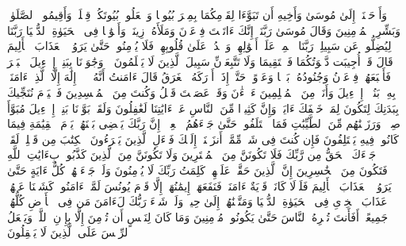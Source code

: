 \startbuffer[\q:10:87]
وَأَوۡحَیۡنَاۤ إِلَىٰ مُوسَىٰ وَأَخِیهِ أَن تَبَوَّءَا لِقَوۡمِكُمَا بِمِصۡرَ بُیُوتࣰا وَٱجۡعَلُوا۟ بُیُوتَكُمۡ قِبۡلَةࣰ وَأَقِیمُوا۟ ٱلصَّلَوٰةَۗ وَبَشِّرِ ٱلۡمُؤۡمِنِینَ%
\stopbuffer
\startbuffer[\q:10:88]
وَقَالَ مُوسَىٰ رَبَّنَاۤ إِنَّكَ ءَاتَیۡتَ فِرۡعَوۡنَ وَمَلَأَهُۥ زِینَةࣰ وَأَمۡوَٰلࣰا فِی ٱلۡحَیَوٰةِ ٱلدُّنۡیَا رَبَّنَا لِیُضِلُّوا۟ عَن سَبِیلِكَۖ رَبَّنَا ٱطۡمِسۡ عَلَىٰۤ أَمۡوَٰلِهِمۡ وَٱشۡدُدۡ عَلَىٰ قُلُوبِهِمۡ فَلَا یُؤۡمِنُوا۟ حَتَّىٰ یَرَوُا۟ ٱلۡعَذَابَ ٱلۡأَلِیمَ%
\stopbuffer
\startbuffer[\q:10:89]
قَالَ قَدۡ أُجِیبَت دَّعۡوَتُكُمَا فَٱسۡتَقِیمَا وَلَا تَتَّبِعَاۤنِّ سَبِیلَ ٱلَّذِینَ لَا یَعۡلَمُونَ%
\stopbuffer
\startbuffer[\q:10:90]
۞ وَجَٰوَزۡنَا بِبَنِیۤ إِسۡرَٰۤءِیلَ ٱلۡبَحۡرَ فَأَتۡبَعَهُمۡ فِرۡعَوۡنُ وَجُنُودُهُۥ بَغۡیࣰا وَعَدۡوًاۖ حَتَّىٰۤ إِذَاۤ أَدۡرَكَهُ ٱلۡغَرَقُ قَالَ ءَامَنتُ أَنَّهُۥ لَاۤ إِلَٰهَ إِلَّا ٱلَّذِیۤ ءَامَنَتۡ بِهِۦ بَنُوۤا۟ إِسۡرَٰۤءِیلَ وَأَنَا۠ مِنَ ٱلۡمُسۡلِمِینَ%
\stopbuffer
\startbuffer[\q:10:91]
ءَاۤلۡءَٰنَ وَقَدۡ عَصَیۡتَ قَبۡلُ وَكُنتَ مِنَ ٱلۡمُفۡسِدِینَ%
\stopbuffer
\startbuffer[\q:10:92]
فَٱلۡیَوۡمَ نُنَجِّیكَ بِبَدَنِكَ لِتَكُونَ لِمَنۡ خَلۡفَكَ ءَایَةࣰۚ وَإِنَّ كَثِیرࣰا مِّنَ ٱلنَّاسِ عَنۡ ءَایَٰتِنَا لَغَٰفِلُونَ%
\stopbuffer
\startbuffer[\q:10:93]
وَلَقَدۡ بَوَّأۡنَا بَنِیۤ إِسۡرَٰۤءِیلَ مُبَوَّأَ صِدۡقࣲ وَرَزَقۡنَٰهُم مِّنَ ٱلطَّیِّبَٰتِ فَمَا ٱخۡتَلَفُوا۟ حَتَّىٰ جَاۤءَهُمُ ٱلۡعِلۡمُۚ إِنَّ رَبَّكَ یَقۡضِی بَیۡنَهُمۡ یَوۡمَ ٱلۡقِیَٰمَةِ فِیمَا كَانُوا۟ فِیهِ یَخۡتَلِفُونَ%
\stopbuffer
\startbuffer[\q:10:94]
فَإِن كُنتَ فِی شَكࣲّ مِّمَّاۤ أَنزَلۡنَاۤ إِلَیۡكَ فَسۡءَلِ ٱلَّذِینَ یَقۡرَءُونَ ٱلۡكِتَٰبَ مِن قَبۡلِكَۚ لَقَدۡ جَاۤءَكَ ٱلۡحَقُّ مِن رَّبِّكَ فَلَا تَكُونَنَّ مِنَ ٱلۡمُمۡتَرِینَ%
\stopbuffer
\startbuffer[\q:10:95]
وَلَا تَكُونَنَّ مِنَ ٱلَّذِینَ كَذَّبُوا۟ بِءَایَٰتِ ٱللَّهِ فَتَكُونَ مِنَ ٱلۡخَٰسِرِینَ%
\stopbuffer
\startbuffer[\q:10:96]
إِنَّ ٱلَّذِینَ حَقَّتۡ عَلَیۡهِمۡ كَلِمَتُ رَبِّكَ لَا یُؤۡمِنُونَ%
\stopbuffer
\startbuffer[\q:10:97]
وَلَوۡ جَاۤءَتۡهُمۡ كُلُّ ءَایَةٍ حَتَّىٰ یَرَوُا۟ ٱلۡعَذَابَ ٱلۡأَلِیمَ%
\stopbuffer
\startbuffer[\q:10:98]
فَلَوۡلَا كَانَتۡ قَرۡیَةٌ ءَامَنَتۡ فَنَفَعَهَاۤ إِیمَٰنُهَاۤ إِلَّا قَوۡمَ یُونُسَ لَمَّاۤ ءَامَنُوا۟ كَشَفۡنَا عَنۡهُمۡ عَذَابَ ٱلۡخِزۡیِ فِی ٱلۡحَیَوٰةِ ٱلدُّنۡیَا وَمَتَّعۡنَٰهُمۡ إِلَىٰ حِینࣲ%
\stopbuffer
\startbuffer[\q:10:99]
وَلَوۡ شَاۤءَ رَبُّكَ لَءَامَنَ مَن فِی ٱلۡأَرۡضِ كُلُّهُمۡ جَمِیعًاۚ أَفَأَنتَ تُكۡرِهُ ٱلنَّاسَ حَتَّىٰ یَكُونُوا۟ مُؤۡمِنِینَ%
\stopbuffer
\startbuffer[\q:10:100]
وَمَا كَانَ لِنَفۡسٍ أَن تُؤۡمِنَ إِلَّا بِإِذۡنِ ٱللَّهِۚ وَیَجۡعَلُ ٱلرِّجۡسَ عَلَى ٱلَّذِینَ لَا یَعۡقِلُونَ%
\stopbuffer
